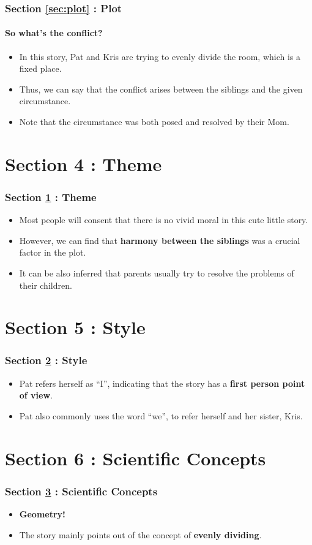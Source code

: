 \documentclass{beamer}
\begin{document}
	\begin{frame}
		\frametitle{Section \ref{sec:plot} : Plot}
		\framesubtitle{So what's the conflict?}
		\begin{itemize}
			\item In this story, Pat and Kris are trying to evenly divide the room, which is a fixed place.
			\item Thus, we can say that the conflict arises {\color{orange}between the siblings and the given circumstance}.
			\item Note that the circumstance was both posed and resolved by their Mom.
		\end{itemize}
	\end{frame}
	
	\section{Section 4 : Theme}\label{sec:theme}
	\begin{frame}
		\frametitle{Section \ref{sec:theme} : Theme}
		\begin{itemize}
			\item Most people will consent that there is no vivid moral in this cute little story.
			\item However, we can find that {\bf \color{violet} harmony between the siblings} was a crucial factor in the plot.
			\item It can be also inferred that parents usually try to resolve the problems of their children.
		\end{itemize}
	\end{frame}
	
	\section{Section 5 : Style}\label{sec:style}
	\begin{frame}
		\frametitle{Section \ref{sec:style} : Style}
		\begin{itemize}
			\item Pat refers herself as ``I'', indicating that the story has a {\bf first person point of view}.
			\item Pat also commonly uses the word ``we'', to refer herself and her sister, Kris.
		\end{itemize}
	\end{frame}
	
	\section{Section 6 : Scientific Concepts}\label{sec:science}
	\begin{frame}
		\frametitle{Section \ref{sec:science} : Scientific Concepts}
		\begin{itemize}
			\item {\bf Geometry!}
			\item The story mainly points out of the concept of {\bf evenly dividing}.
		\end{itemize}
	\end{frame}
	
\end{document}
